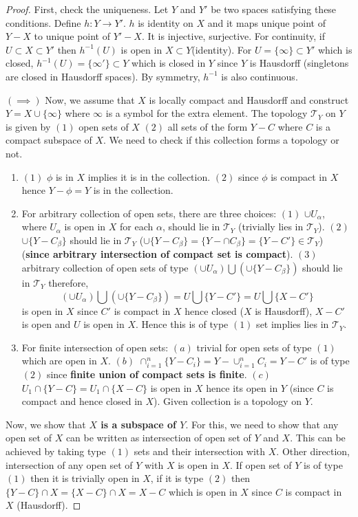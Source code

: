 \documentclass[12pt,reqno]{amsart}
\theoremstyle{plain}
\theoremstyle{definition}
\newcommand{\cal}[1]{\mathcal{#1}}
\begin{document}
\begin{proof}
    First, check the uniqueness. Let $Y$ and $Y'$ be two spaces satisfying these conditions. Define $h:Y \to Y'$. $h$ is identity on $X$ and it maps unique point of $Y-X$ to unique point of $Y'-X$. It is injective, surjective. For continuity, if $U \subset X \subset Y'$ then $h^{-1}(U)$ is open in $X \subset Y$(identity). For $U = \{\infty\} \subset Y'$ which is closed, $h^{-1}(U) = \{\infty'\} \subset Y$ which is closed in $Y$ since $Y$ is Hausdorff (singletons are closed in Hausdorff spaces). By symmetry, $h^{-1}$ is also continuous.

    \noindent$(\implies)$ Now, we assume that $X$ is locally compact and Hausdorff and construct $Y = X \cup \{\infty\}$ where $\infty$ is a symbol for the extra element. The topology $\cal T_Y$ on $Y$ is given by $(1)$ open sets of $X$ $(2)$ all sets of the form $Y - C$ where $C$ is a compact subspace of $X$. We need to check if this collection forms a topology or not. 
    \begin{enumerate}
        \item $(1)$ $\phi$ is in $X$ implies it is in the collection. $(2)$ since $\phi$ is compact in $X$ hence $Y - \phi = Y$ is in the collection. 
        \item  For arbitrary collection of open sets, there are three choices: $(1)$ $\cup U_\alpha$, where $U_\alpha$ is open in $X$ for each $\alpha$, should lie in $\cal T_Y$ (trivially lies in $\cal T_Y$). $(2)$ $\cup\{Y - C_\beta\}$ should lie in $\cal T_Y$ ($\cup\{Y - C_\beta\} = \{Y - \cap C_\beta\} = \{Y - C'\} \in \cal T_Y$) ({\bf since arbitrary intersection of compact set is compact}).  $(3)$ arbitrary collection of open sets of type $(\cup U_\alpha) \bigcup (\cup \{Y - C_\beta\})$ should lie in $\cal T_Y$ therefore, 
        $$ (\cup U_\alpha) \bigcup (\cup \{Y - C_\beta\}) = U \bigcup \{Y - C'\} = U \bigcup \{X - C'\}$$ 
        is open in $X$ since $C'$ is compact in $X$ hence closed ($X$ is Hausdorff), $X - C'$ is open and $U$ is open in $X$. Hence this is of type $(1)$ set implies lies in $\cal T_Y$.
        \item For finite intersection of open sets: $(a)$ trivial for open sets of type $(1)$ which are open in $X$. $(b)$ $\cap_{i=1}^n \{Y - C_i\} = Y - \cup_{i=1}^n C_i = Y - C'$ is of type $(2)$ since {\bf finite union of compact sets is finite}. $(c)$ $U_1 \cap \{Y - C\} = U_1 \cap \{X - C\}$ is open in $X$ hence its open in $Y$ (since $C$ is compact and hence closed in $X$). Given collection is a topology on $Y$.
    \end{enumerate}
    Now, we show that {\bf $X$ is a subspace of $Y$}. For this, we need to show that any open set of $X$ can be written as intersection of open set of $Y$ and $X$. This can be achieved by taking type $(1)$ sets and their intersection with $X$. Other direction, intersection of any open set of $Y$ with $X$ is open in $X$. If open set of $Y$ is of type $(1)$ then it is trivially open in $X$, if it is type $(2)$ then $\{Y - C\} \cap X = \{X - C\} \cap X = X - C$ which is open in $X$ since $C$ is compact in $X$ (Hausdorff).


\end{proof}
\end{document}
